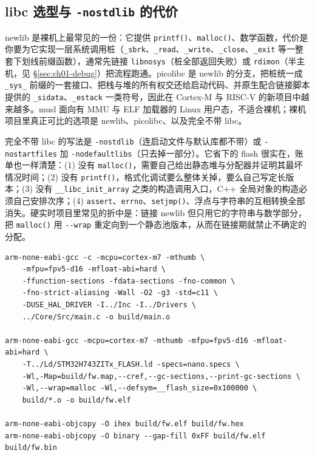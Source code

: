 \documentclass[12pt,a4paper,fontset=fandol]{ctexbook}
\newcommand{\Fn}[1]{\texttt{#1()}}
\newcommand{\Tp}[1]{\texttt{#1}}
\newcommand{\Opt}[1]{\texttt{-\/-#1}}
\begin{document}
\subsection{libc 选型与 \Tp{-nostdlib} 的代价}

newlib 是裸机上最常见的一份：它提供 \Fn{printf}、\Fn{malloc}、数学函数，代价是你要为它实现一层系统调用桩（\Tp{\_sbrk}、\Tp{\_read}、\Tp{\_write}、\Tp{\_close}、\Tp{\_exit} 等一整套下划线前缀函数），通常先链接 \Tp{libnosys}（桩全部返回失败）或 \Tp{rdimon}（半主机，见 \S\ref{sec:ch01-debug}）把流程跑通。picolibc 是 newlib 的分支，把桩统一成 \Tp{\_sys\_} 前缀的一套接口、把栈与堆的所有权交还给启动代码、并原生配合链接脚本提供的 \Tp{\_sidata}、\Tp{\_estack} 一类符号，因此在 Cortex-M 与 RISC-V 的新项目中越来越多。musl 面向有 MMU 与 ELF 加载器的 Linux 用户态，不适合裸机；裸机项目里真正可比的选项是 newlib、picolibc、以及完全不带 libc。

完全不带 libc 的写法是 \Tp{-nostdlib}（连启动文件与默认库都不带）或 \Tp{-nostartfiles} 加 \Tp{-nodefaultlibs}（只去掉一部分）。它省下的 flash 很实在，账单也一样清楚：(1) 没有 \Fn{malloc}，需要自己给出静态堆与分配器并证明其最坏情况时间；(2) 没有 \Fn{printf}，格式化调试要么整体关掉，要么自己写定长版本；(3) 没有 \Tp{\_\_libc\_init\_array} 之类的构造调用入口，C++ 全局对象的构造必须自己安排次序；(4) \Tp{assert}、\Tp{errno}、\Fn{setjmp}、浮点与字符串的互相转换全部消失。硬实时项目里常见的折中是：链接 newlib 但只用它的字符串与数学部分，把 \Fn{malloc} 用 \Opt{wrap} 重定向到一个静态池版本，从而在链接期就禁止不确定的分配。

\begin{lstlisting}[style=shellstyle,caption={裸机交叉编译与链接的完整命令行（Cortex-M7、hard float）},label={lst:ch01-gccline}]
arm-none-eabi-gcc -c -mcpu=cortex-m7 -mthumb \
    -mfpu=fpv5-d16 -mfloat-abi=hard \
    -ffunction-sections -fdata-sections -fno-common \
    -fno-strict-aliasing -Wall -O2 -g3 -std=c11 \
    -DUSE_HAL_DRIVER -I../Inc -I../Drivers \
    ../Core/Src/main.c -o build/main.o

arm-none-eabi-gcc -mcpu=cortex-m7 -mthumb -mfpu=fpv5-d16 -mfloat-abi=hard \
    -T../Ld/STM32H743ZITx_FLASH.ld -specs=nano.specs \
    -Wl,-Map=build/fw.map,--cref,--gc-sections,--print-gc-sections \
    -Wl,--wrap=malloc -Wl,--defsym=__flash_size=0x100000 \
    build/*.o -o build/fw.elf

arm-none-eabi-objcopy -O ihex build/fw.elf build/fw.hex
arm-none-eabi-objcopy -O binary --gap-fill 0xFF build/fw.elf build/fw.bin
\end{lstlisting}
\end{document}
